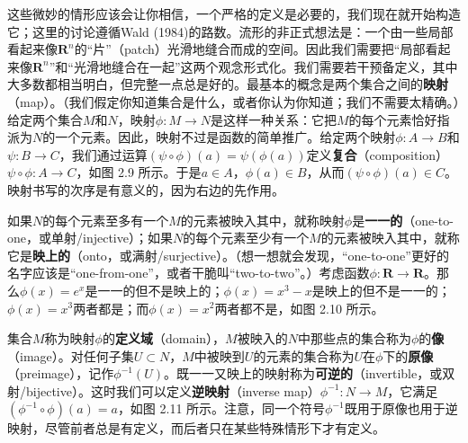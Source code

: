 

这些微妙的情形应该会让你相信，一个严格的定义是必要的，我们现在就开始构造它；这里的讨论遵循Wald (1984)的路数。流形的非正式想法是：一个由一些局部看起来像$\mathbf{R}^n$的“片”（patch）光滑地缝合而成的空间。因此我们需要把“局部看起来像$\mathbf{R}^n$”和“光滑地缝合在一起”这两个观念形式化。我们需要若干预备定义，其中大多数都相当明白，但完整一点总是好的。最基本的概念是两个集合之间的\textbf{映射}（map）。（我们假定你知道集合是什么，或者你认为你知道；我们不需要太精确。）给定两个集合$M$和$N$，映射$\phi:M\to N$是这样一种关系：它把$M$的每个元素恰好指派为$N$的一个元素。因此，映射不过是函数的简单推广。给定两个映射$\phi:A\to B$和$\psi:B\to C$，我们通过运算$(\psi\circ\phi)(a)=\psi(\phi(a))$定义\textbf{复合}（composition）$\psi\circ\phi:A\to C$，如图 2.9 所示。于是$a\in A$，$\phi(a)\in B$，从而$(\psi\circ\phi)(a)\in C$。映射书写的次序是有意义的，因为右边的先作用。

如果$N$的每个元素至多有一个$M$的元素被映入其中，就称映射$\phi$是\textbf{一一的}（one-to-one，或单射/injective）；如果$N$的每个元素至少有一个$M$的元素被映入其中，就称它是\textbf{映上的}（onto，或满射/surjective）。（想一想就会发现，“one-to-one”更好的名字应该是“one-from-one”，或者干脆叫“two-to-two”。）考虑函数$\phi:\mathbf{R}\to\mathbf{R}$。那么$\phi(x)=e^x$是一一的但不是映上的；$\phi(x)=x^3-x$是映上的但不是一一的；$\phi(x)=x^3$两者都是；而$\phi(x)=x^2$两者都不是，如图 2.10 所示。



集合$M$称为映射$\phi$的\textbf{定义域}（domain），$M$被映入的$N$中那些点的集合称为$\phi$的\textbf{像}（image）。对任何子集$U\subset N$，$M$中被映到$U$的元素的集合称为$U$在$\phi$下的\textbf{原像}（preimage），记作$\phi^{-1}(U)$。既一一又映上的映射称为\textbf{可逆的}（invertible，或双射/bijective）。这时我们可以定义\textbf{逆映射}（inverse map）$\phi^{-1}:N\to M$，它满足$(\phi^{-1}\circ\phi)(a)=a$，如图 2.11 所示。注意，同一个符号$\phi^{-1}$既用于原像也用于逆映射，尽管前者总是有定义，而后者只在某些特殊情形下才有定义。


